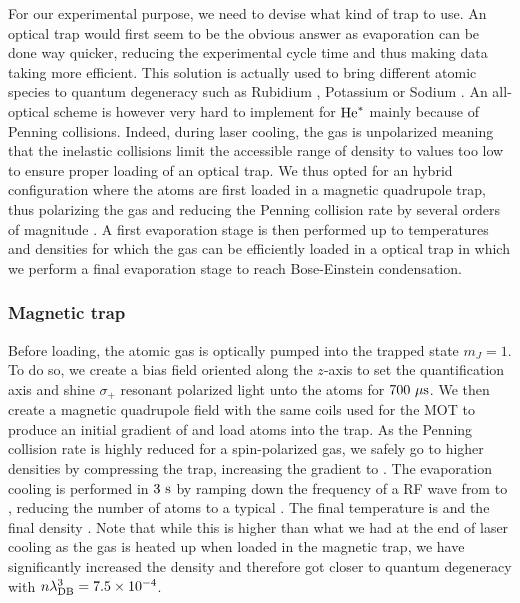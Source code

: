 For our experimental purpose, we need to devise what kind of trap to use. An optical trap would first seem to be the obvious answer as evaporation can be done way quicker, reducing the experimental cycle time and thus making data taking more efficient. This solution is actually used to bring different atomic species to quantum degeneracy such as Rubidium \cite{barrett2001all}, Potassium \cite{salomon2014all} or Sodium \cite{jacob2011production}. An all-optical scheme is however very hard to implement for $\mathrm{He}^*$ mainly because of Penning collisions. Indeed, during laser cooling, the gas is unpolarized meaning that the inelastic collisions limit the accessible range of density to values too low to ensure proper loading of an optical trap.  We thus opted for an hybrid configuration where the atoms are first loaded in a magnetic quadrupole trap, thus polarizing the gas and reducing the Penning collision rate by several orders of magnitude \cite{shlyapnikov1994decay}. A first evaporation stage is then performed up to temperatures and densities for which the gas can be efficiently loaded in a optical trap in which we perform a final evaporation stage to reach Bose-Einstein condensation.

\subsubsection{Magnetic trap}

Before loading, the atomic gas is optically pumped into the trapped state $m_J=1$. To do so, we create a bias field oriented along the $z$-axis to set the quantification axis and shine $\sigma_{+}$ resonant polarized light unto the atoms for $700 \ \mu \rm{s}$. We then create a magnetic quadrupole field with the same coils used for the MOT to produce an initial gradient of  and load  atoms into the trap. As the Penning collision rate is highly reduced for a spin-polarized gas, we safely go to higher densities by compressing the trap, increasing the gradient to . The evaporation cooling is performed in $3 \ \rm{s}$ by ramping down the frequency of a RF wave from  to , reducing the number of atoms to a typical . The final temperature is  and the final density . Note that while this is higher than what we had at the end of laser cooling as the gas is heated up when loaded in the magnetic trap, we have significantly increased the density and therefore got closer to quantum degeneracy with $n \lambda_{\rm{DB}}^3=7.5 \times 10^{-4}$.


